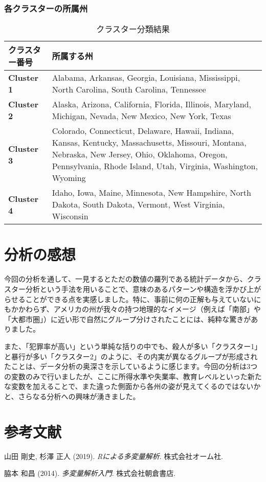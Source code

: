 \documentclass{article}
\begin{document}
\subsubsection*{各クラスターの所属州}
\begin{table}[H]
    \centering
    \caption{クラスター分類結果}
    \label{tab:clusters}
    \begin{tabularx}{\textwidth}{|l|X|}
        \hline
        \textbf{クラスター番号} & \textbf{所属する州} \\
        \hline
        \textbf{Cluster 1} & Alabama, Arkansas, Georgia, Louisiana, Mississippi, North Carolina, South Carolina, Tennessee \\
        \hline
        \textbf{Cluster 2} & Alaska, Arizona, California, Florida, Illinois, Maryland, Michigan, Nevada, New Mexico, New York, Texas \\
        \hline
        \textbf{Cluster 3} & Colorado, Connecticut, Delaware, Hawaii, Indiana, Kansas, Kentucky, Massachusetts, Missouri, Montana, Nebraska, New Jersey, Ohio, Oklahoma, Oregon, Pennsylvania, Rhode Island, Utah, Virginia, Washington, Wyoming \\
        \hline
        \textbf{Cluster 4} & Idaho, Iowa, Maine, Minnesota, New Hampshire, North Dakota, South Dakota, Vermont, West Virginia, Wisconsin \\
        \hline
    \end{tabularx}
\end{table}


\section{分析の感想}
今回の分析を通して、一見するとただの数値の羅列である統計データから、クラスター分析という手法を用いることで、意味のあるパターンや構造を浮かび上がらせることができる点を実感しました。特に、事前に何の正解も与えていないにもかかわらず、アメリカの州が我々の持つ地理的なイメージ（例えば「南部」や「大都市圏」）に近い形で自然にグループ分けされたことには、純粋な驚きがありました。

また、「犯罪率が高い」という単純な括りの中でも、殺人が多い「クラスター1」と暴行が多い「クラスター2」のように、その内実が異なるグループが形成されたことは、データ分析の奥深さを示しているように感じます。今回の分析は3つの変数のみで行いましたが、ここに所得水準や失業率、教育レベルといった新たな変数を加えることで、また違った側面から各州の姿が見えてくるのではないかと、さらなる分析への興味が湧きました。

\section{参考文献}
\begin{thebibliography}{9}
    \item 山田 剛史, 杉澤 正人 (2019). \textit{Rによる多変量解析}. 株式会社オーム社.
    \item 脇本 和昌 (2014). \textit{多変量解析入門}. 株式会社朝倉書店.
\end{thebibliography}
\end{document}
